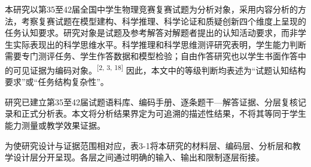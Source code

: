 \documentclass[
  12pt,
  a4paper,twoside,openany]{ctexbook}
\begin{document}
本研究以第35至42届全国中学生物理竞赛复赛试题为分析对象，采用内容分析的方法，考察复赛试题在模型建构、科学推理、科学论证和质疑创新四个维度上呈现的任务认知要求。研究对象是试题及参考解答对解题者提出的认知活动要求，而非学生实际表现出的科学思维水平。科学推理和科学思维测评研究表明，学生能力判断需要专门测评任务、学生作答数据和模型检验；自由作答研究也以学生书面作答中的可见证据为编码对象。\textsuperscript{[2, 3, 18]}
因此，本文中的等级判断均表述为``试题认知结构要求''或``任务结构复杂性''。

研究已建立第35至42届试题语料库、编码手册、逐条题干---解答证据、分层复核记录和正式分析表。本文将分析结果界定为可追溯的描述性结果，不将其等同于学生能力测量或教学效果证据。

为使研究设计与证据范围相对应，表3-1将本研究的材料层、编码层、分析层和教学设计层分开呈现。各层之间通过明确的输入、输出和限制逐层衔接。
\end{document}
